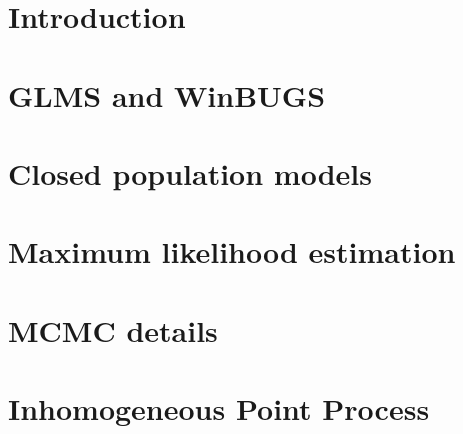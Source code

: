 \documentclass{book}
\begin{document}
\chapter{Introduction}
\label{chapt.intro}

\chapter{GLMS and WinBUGS}
\label{chapt.glms}

\chapter{Closed population models}
\label{chapt.closed}



\chapter{Maximum likelihood estimation}
\label{chapt.mle}

\chapter{MCMC details}
\label{chapt.mcmc}

\chapter{Inhomogeneous Point Process}
\label{chapt.ipp}



\end{document}
